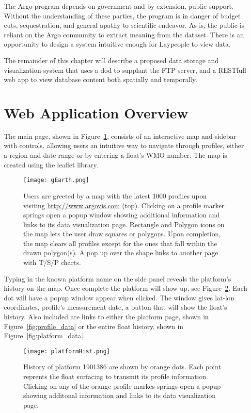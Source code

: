 The Argo program depends on government and by extension, public support. Without the understanding of these parties, the program is in danger of budget cuts, sequestration, and general apathy to scientific endeavor. As is, the public is reliant on the Argo community to extract meaning from the dataset. There is an opportunity to design a system intuitive enough for Laypeople to view data. 

The remainder of this chapter will describe a proposed data storage and visualization system that uses a \gls{dod} to supplant the FTP server, and a RESTfull web app to view database content both spatially and temporally.

\section{Web Application Overview}
The main page, shown in Figure~\ref{fig:main_page}, consists of an interactive map and sidebar with controls, allowing users an intuitive way to navigate through profiles, either a region and date range or by entering a float's WMO number. The map is created using the \gls{leaflet} library.

\begin{figure}[ht]
\begin{minipage}{6in}
\centering
\texttt{[image: gEarth.png]}
\caption{\label{fig:main_page} Users are greeted by a map with the latest 1000 profiles upon visiting \url{http://www.argovis.com} (top). Clicking on a profile marker springs open a popup window showing additional information and links to its data visualization page. Rectangle and Polygon icons on the map lets the user draw squares or polygons. Upon completion, the map clears all profiles except for the ones that fall within the drawn polygon(s). A pop up over the shape links to another page with T/S/P charts.}
\end{minipage}
\end{figure}
Typing in the known platform name on the side panel reveals the platform's history on the map. Once complete the platform will show up, see Figure~\ref{fig:prof_hist}. Each dot will have a popup window appear when clicked. The window gives lat-lon coordinates, profile's measurement date, a button that will show the float's history. Also included are links to either the platform page, shown in Figure~\ref{fig:profile_data} or the entire float history, shown in Figure~\ref{fig:platform_data}.

\begin{figure}[ht]
\centering
\begin{minipage}{6in}
\texttt{[image: platformHist.png]}
\caption{\label{fig:prof_hist} History of platform 1901386 are shown by orange dots. Each point reprents the float surfacing to transmit its profile information. Clicking on any of the orange profile markes springs open a popup showing additonal information and links to its data visualization page.}
\end{minipage}
\end{figure}

